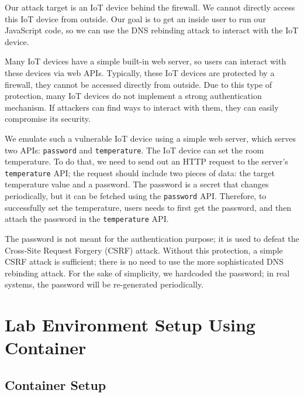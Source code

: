 Our attack target is an IoT device behind the firewall. We cannot directly
access this IoT device from outside. Our goal is to get an inside
user to run our JavaScript code, so we can use
the DNS rebinding attack to interact with the IoT device.


Many IoT devices have a simple built-in web server, so users can
interact with these devices via web APIs. Typically, these IoT
devices are protected by a firewall, they cannot be accessed directly
from outside. Due to this type of protection,  many IoT devices do not
implement a strong authentication mechanism. If attackers can find ways
to interact with them, they can easily compromise its security.

We emulate such a vulnerable IoT device using 
a simple web server, which serves
two APIs: \texttt{password} and \texttt{temperature}.
The IoT device can set the room temperature. To do that,
we need to send out an HTTP request to the server's
\texttt{temperature} API; the request should include
two pieces of data: the target temperature value and a
password.  The password is a secret that changes
periodically, but it can be fetched using
the \texttt{password} API. Therefore, to successfully
set the temperature, users needs to
first get the password, and then attach the password
in the \texttt{temperature} API.

The password is not meant for the authentication purpose; it is used to defeat the Cross-Site
Request Forgery (CSRF) attack. Without this protection, a simple CSRF attack is sufficient;
there is no need to use the more sophisticated DNS rebinding attack.
For the sake of simplicity, we hardcoded the
password; in real systems, the password will be re-generated periodically.




\section{Lab Environment Setup Using Container}



\subsection{Container Setup}



